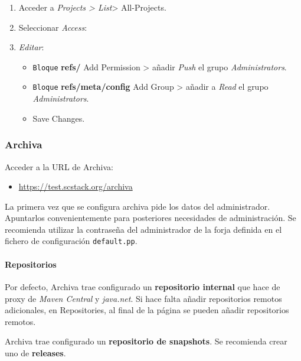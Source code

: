 \begin{enumerate}
    \item Acceder a \emph{Projects \textgreater{} List}\textgreater{} All-Projects.
    \item Seleccionar \emph{Access}:
    \item \emph{Editar}:
    \begin{itemize}
	    \item \texttt{Bloque} \textbf{refs/} Add Permission \textgreater{} añadir \emph{Push} el grupo \emph{Administrators}.
	    \item \texttt{Bloque} \textbf{refs/meta/config} Add Group \textgreater{} añadir a \emph{Read} el grupo \emph{Administrators}.
	    \item Save Changes.
    \end{itemize}
\end{enumerate}


\subsubsection{Archiva}
\label{subs:conf-archiva}

\par Acceder a la URL de Archiva:

\begin{itemize}
    \item \url{https://test.scstack.org/archiva}
\end{itemize}

\par La primera vez que se configura archiva pide los datos del administrador. Apuntarlos convenientemente para posteriores necesidades de administración. Se recomienda utilizar la contraseña del administrador de la forja definida en el fichero de configuración \texttt{default.pp}.

\paragraph{Repositorios}

\par Por defecto, Archiva trae configurado un \textbf{repositorio internal} que hace de proxy de \emph{Maven Central} y \emph{java.net}. Si hace falta añadir repositorios remotos adicionales, en Repositories, al final de la página se pueden añadir repositorios remotos.

\par Archiva trae configurado un \textbf{repositorio de snapshots}. Se recomienda crear uno de \textbf{releases}.

